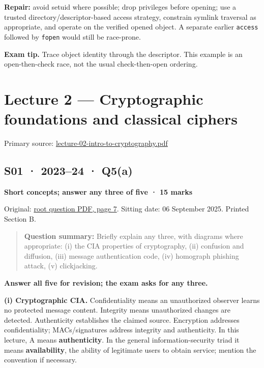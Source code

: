 \documentclass[11pt,a4paper]{article}
\begin{document}
\textbf{Repair:} avoid setuid where possible; drop privileges before opening; use a trusted directory/\allowbreak{}descriptor-based access strategy,\allowbreak{} constrain symlink traversal as appropriate,\allowbreak{} and operate on the verified opened object. A separate earlier \texttt{access} followed by \texttt{fopen} would still be race-prone.



{\color{ForestGreen}\textbf{Exam tip.} Trace object identity through the descriptor. This example is an open-then-check race,\allowbreak{} not the usual check-then-open ordering.}



\clearpage
\section{Lecture 2 — Cryptographic foundations and classical ciphers}

Primary source: \href{../slides/lecture-02-intro-to-cryptography.pdf}{lecture-02-intro-to-cryptography.\allowbreak{}pdf}




\subsection{S01 · 2023–24 · Q5(a)}\label{s01}

\textbf{Short concepts; answer any three of five · 15 marks}


Original: \href{../../CSE405-Security_Merged.pdf\#page=7}{root question PDF,\allowbreak{} page 7}. Sitting date: 06 September 2025. Printed Section B.



\begin{quote}\small

\textbf{Question summary:} Briefly explain any three,\allowbreak{} with diagrams where appropriate: (i) the CIA properties of cryptography,\allowbreak{} (ii) confusion and diffusion,\allowbreak{} (iii) message authentication code,\allowbreak{} (iv) homograph phishing attack,\allowbreak{} (v) clickjacking.



\end{quote}

\textbf{Answer all five for revision; the exam asks for any three.}


\textbf{(i) Cryptographic CIA.} Confidentiality means an unauthorized observer learns no protected message content. Integrity means unauthorized changes are detected. Authenticity establishes the claimed source. Encryption addresses confidentiality; MACs/\allowbreak{}signatures address integrity and authenticity. In this lecture,\allowbreak{} A means \textbf{authenticity}. In the general information-security triad it means \textbf{availability},\allowbreak{} the ability of legitimate users to obtain service; mention the convention if necessary.
\end{document}
